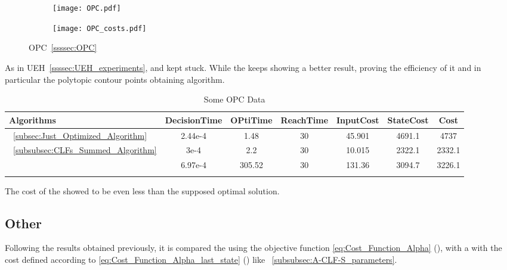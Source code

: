  \begin{figure}[htbp]
  \begin{subfigure}{0.5\textwidth}
    \centering
    \texttt{[image: OPC.pdf]}
  \label{fig:OPC_CostEvol}
  \end{subfigure}
  \begin{subfigure}{0.6\textwidth}
    \centering
    \texttt{[image: OPC\_costs.pdf]}
  \label{fig:OPC_trajectory}
  \end{subfigure}
  \caption{OPC~\ref{ssssec:OPC}}
\label{fig:OPCTrajectory_and_CostEvol}
\end{figure}


As in UEH~\ref{ssssec:UEH_experiments},  and   kept stuck. While the  keeps showing a better result, proving the efficiency of it and in particular the polytopic contour points obtaining algorithm. 


  \bgroup
 \begin{xltabular}{\textwidth}{|l|cccccc|}
   \toprule
   Algorithms   & DecisionTime & OPtiTime & ReachTime  & InputCost   & StateCost & Cost           \\
   \midrule
    ~\ref{subsec:Just_Optimized_Algorithm}           & 2.44e-4 & 1.48 & 30 & 45.901  & 4691.1  & 4737 \\
    ~\ref{subsubsec:CLFs_Summed_Algorithm}        & 3e-4 & 2.2     & 30 & 10.015 & 2322.1 &  2332.1 \\
                          & 6.97e-4  & 305.52     & 30  & 131.36 & 3094.7 & 3226.1 \\
    \midrule
    \caption{Some OPC Data}
    \label{tab:Some_OPC_Data}\\
   \end{xltabular}
 \egroup


The cost of the  showed to be even less than the supposed optimal solution.


\newpage %

\subsection{Other}
\label{subsec:other_experiments}

Following the results obtained previously, it is compared the  using the objective function \ref{eq:Cost_Function_Alpha} (), with a  with the cost defined according to \ref{eq:Cost_Function_Alpha_last_state} () like ~\ref{subsubsec:A-CLF-S_parameters}.\\

